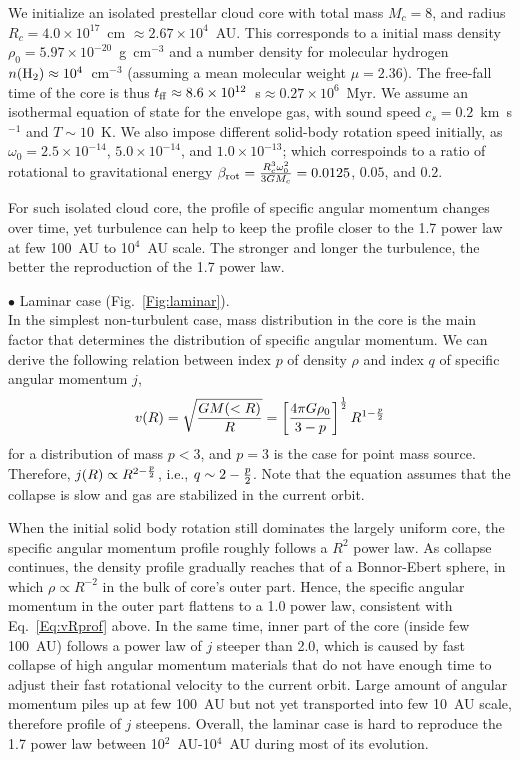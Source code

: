 We initialize an isolated prestellar cloud core with total mass
$M_c=8$\msun, and radius $R_c=4.0 \times 10^{17}$~cm
$\approx 2.67 \times 10^4$~AU. This corresponds to a initial mass density
$\rho_0=5.97 \times 10^{-20}$~g~cm$^{-3}$ and a number density for molecular
hydrogen $n({\rm H}_2) \approx 10^4$~cm$^{-3}$ (assuming a mean molecular
weight $\mu=2.36$). The free-fall time of the core is thus
$t_{\rm ff} \approx 8.6 \times 10^{12}$~s$\approx 0.27 \times 10^6$~Myr.
We assume an isothermal equation of state for the envelope gas, with
sound speed $c_s=0.2$~km~s$^{-1}$ and $T \sim 10$~K. We also impose different
solid-body rotation speed initially, as $\omega_0=2.5 \times 10^{-14}$,
$5.0 \times 10^{-14}$, and $1.0 \times 10^{-13}$; which correspoinds to
a ratio of rotational to gravitational energy
$\beta_{\rm rot}={R_c^3 \omega_0^2 \over 3 G M_c} = 0.0125$, $0.05$, and
$0.2$.

For such isolated cloud core, the profile of specific angular momentum
changes over time, yet turbulence can help to keep the profile
closer to the 1.7 power law at few 100~AU to 10$^4$~AU scale.
The stronger and longer the turbulence,
the better the reproduction of the 1.7 power law.

\noindent $\bullet$ Laminar case (Fig.~\ref{Fig:laminar}). \\
In the simplest non-turbulent case, mass distribution in the core is the main 
factor that determines the distribution of specific angular momentum. 
We can derive the following relation between index $p$ of density $\rho$ and 
index $q$ of specific angular momentum $j$, 
\begin{equation}
\label{Eq:vRprof}
v(R)=\sqrt{G M(<R) \over R}=\left[{ 4 \pi G \rho_0 \over 3-p}\right]^{1 \over 2
} R^{1-{p \over 2}}
\end{equation}
for a distribution of mass $p<3$, and $p=3$ is the case for point mass source.
Therefore, $j(R) \propto R^{2-{p \over 2}}$, i.e., $q \sim 2-{p \over2 }$. 
Note that the equation assumes that the collapse is slow and gas are stabilized 
in the current orbit.

When the initial solid body rotation still dominates the largely uniform core,
the specific angular momentum profile roughly follows a $R^2$ power law.
As collapse continues, the density profile gradually reaches
that of a Bonnor-Ebert sphere, in which $\rho \propto R^{-2}$
in the bulk of core's outer part.
Hence, the specific angular momentum in the outer part flattens to
a 1.0 power law, consistent with Eq.~\ref{Eq:vRprof} above. In the same
time, inner part of the core (inside few 100~AU) follows a power law of
$j$ steeper than 2.0, which is caused by fast collapse of high angular momentum
materials that do not have enough time to adjust their fast
rotational velocity to the current orbit. Large amount of angular
momentum piles up at few 100~AU but not yet transported into few 10~AU scale,
therefore profile of $j$ steepens. Overall, the laminar case is hard
to reproduce the 1.7 power law between
10$^2$~AU-10$^4$~AU during most of its evolution.

